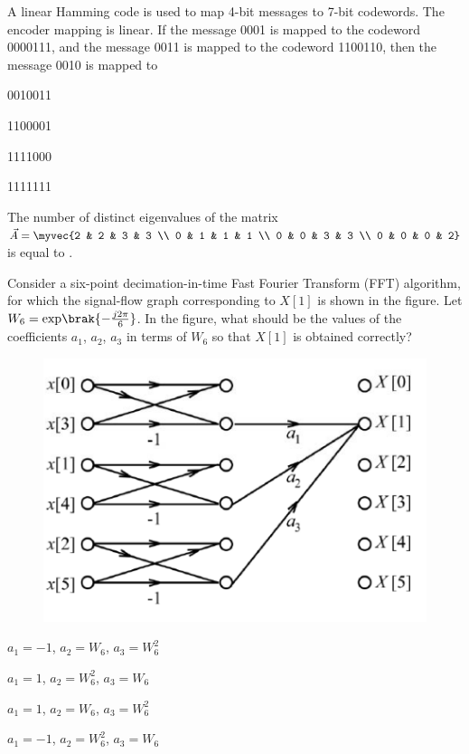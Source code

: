    \item A linear Hamming code is used to map 4-bit messages to 7-bit codewords. The encoder mapping is linear. If the message 0001 is mapped to the codeword 0000111, and the message 0011 is mapped to the codeword 1100110, then the message 0010 is mapped to
    \hfill{}
    \begin{enumerate}
        \begin{multicols}{4}
            \item 0010011
            \item 1100001
            \item 1111000
            \item 1111111
        \end{multicols}
    \end{enumerate}
    \item The number of distinct eigenvalues of the matrix
   $ 
    \vec{A} = \myvec{2 & 2 & 3 & 3 \\ 0 & 1 & 1 & 1 \\ 0 & 0 & 3 & 3 \\ 0 & 0 & 0 & 2}
  $ 
    is equal to \underline{\hspace{2cm}}.
    \hfill{}
\item Consider a six-point decimation-in-time Fast Fourier Transform (FFT) algorithm, for which the signal-flow graph corresponding to $X[1]$ is shown in the figure. Let $W_{6}=\text{exp}\brak{-\frac{j2\pi}{6}}$. In the figure, what should be the values of the coefficients $a_{1}$, $a_{2}$, $a_{3}$ in terms of $W_{6}$ so that $X[1]$ is obtained correctly?
    \hfill{}
    \begin{figure}[H]
        \centering
        \includegraphics[width=0.5\columnwidth]{GATE/2019/EC/figs/q28.png}
        \caption{}
        \label{fig:q28}
    \end{figure}
    \begin{enumerate}
    \begin{multicols}{2}
        \item $a_{1}=-1$, $a_{2}=W_{6}$, $a_{3}=W_{6}^{2}$
        \item $a_{1}=1$, $a_{2}=W_{6}^{2}$, $a_{3}=W_{6}$
        \item $a_{1}=1$, $a_{2}=W_{6}$, $a_{3}=W_{6}^{2}$
        \item $a_{1}=-1$, $a_{2}=W_{6}^{2}$, $a_{3}=W_{6}$
    \end{multicols}
    \end{enumerate}

